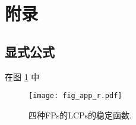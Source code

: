 
\appendix
{} 
\section*{附录}
\renewcommand{\thesubsection}{\Alph{subsection}}

\subsection{显式公式}\label{app:coarse}





在图 \ref{fig:app_2} 中 

\begin{figure} [tbhp!]
	\centering
	\texttt{[image: fig\_app\_r.pdf]}
	\caption{四种FPs的LCPs的稳定函数. }\label{fig:app_2}
\end{figure}